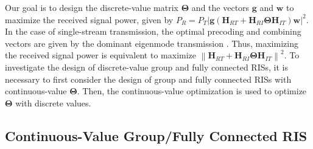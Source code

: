 \documentclass[twocolumn,10pt]{IEEEtran}
\begin{document}
Our goal is to design the discrete-value matrix $\boldsymbol{\Theta}$ and the vectors $\mathbf{g}$ and $\mathbf{w}$ to maximize the received signal power, given by $P_{R}=P_{T}\left|\mathbf{g}\left(\mathbf{H}_{RT}+\mathbf{H}_{RI}\boldsymbol{\Theta}\mathbf{H}_{IT}\right)\mathbf{w}\right|^{2}$.
In the case of single-stream transmission, the optimal precoding and combining vectors are given by the dominant eigenmode transmission \cite{cle13}.
Thus, maximizing the received signal power is equivalent to maximize $\left\|\mathbf{H}_{RT}+\mathbf{H}_{RI}\boldsymbol{\Theta}\mathbf{H}_{IT}\right\|^{2}$.
To investigate the design of discrete-value group and fully connected RISs, it is necessary to first consider the design of group and fully connected RISs with continuous-value $\boldsymbol{\Theta}$.
Then, the continuous-value optimization is used to optimize $\boldsymbol{\Theta}$ with discrete values.

\subsection{Continuous-Value Group/Fully Connected RIS}
\end{document}
